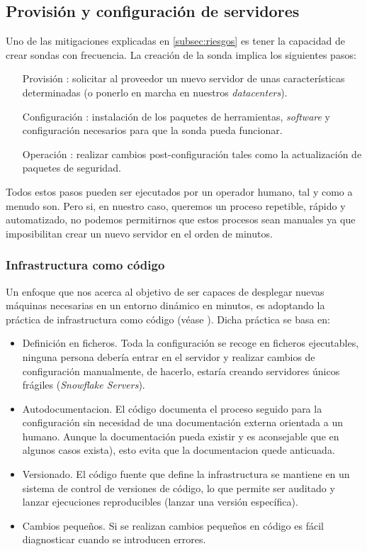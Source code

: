 \subsection{Provisión y configuración de servidores}
\label{subsec:server-config}

Uno de las mitigaciones explicadas en \ref{subsec:riesgos} es tener la capacidad de crear sondas con frecuencia. La creación de la sonda implica
los siguientes pasos:

\begin{enumerate}
    \item[Provisión]: solicitar al proveedor un nuevo servidor de unas características determinadas (o ponerlo en marcha en nuestros \emph{datacenters}).
    \item[Configuración]: instalación de los paquetes de herramientas, \emph{software} y configuración necesarios para que la sonda pueda funcionar.
    \item[Operación]: realizar cambios post-configuración tales como la actualización de paquetes de seguridad.
\end{enumerate}

Todos estos pasos pueden ser ejecutados por un operador humano, tal y como a menudo son. Pero si, en nuestro caso, queremos un proceso repetible, rápido y automatizado,
no podemos permitirnos que estos procesos sean manuales ya que imposibilitan crear un nuevo servidor en el orden de minutos.

\subsubsection{Infrastructura como código}
\label{subsec:infra-as-code}

Un enfoque que nos acerca al objetivo de ser capaces de desplegar nuevas máquinas necesarias en un entorno dinámico en minutos, es adoptando la práctica
de infrastructura como código (véase \cite{fowler-infra-as-code}). Dicha práctica se basa en:

\begin{itemize}
    \item Definición en ficheros. Toda la configuración se recoge en ficheros ejecutables, ninguna persona debería entrar en el servidor
    y realizar cambios de configuración manualmente, de hacerlo, estaría creando servidores únicos frágiles (\emph{Snowflake Servers}).
    \item Autodocumentacion. El código documenta el proceso seguido para la configuración sin necesidad de una documentación externa orientada a un humano. Aunque la documentación pueda existir y es aconsejable que en algunos casos exista), esto evita que la documentacion quede anticuada.
    \item Versionado. El código fuente que define la infrastructura se mantiene en un sistema de control de versiones de código, lo que permite ser auditado y lanzar ejecuciones reproducibles (lanzar una versión específica).
    \item Cambios pequeños. Si se realizan cambios pequeños en código es fácil diagnosticar cuando se introducen errores.
\end{itemize}
 
